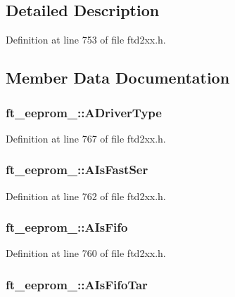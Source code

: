 \subsection{Detailed Description}


Definition at line 753 of file ftd2xx.h.

\subsection{Member Data Documentation}
\hypertarget{structft__eeprom__2232_ad86a60a990160e5976e563365b7d05d0}{
\subsubsection[{ADriverType}]{ {\bf ft\_\-eeprom\_::ADriverType}}}
\label{structft__eeprom__2232_ad86a60a990160e5976e563365b7d05d0}


Definition at line 767 of file ftd2xx.h.\hypertarget{structft__eeprom__2232_acbcbf6335afad8a22eac6a575f385785}{
\subsubsection[{AIsFastSer}]{ {\bf ft\_\-eeprom\_::AIsFastSer}}}
\label{structft__eeprom__2232_acbcbf6335afad8a22eac6a575f385785}


Definition at line 762 of file ftd2xx.h.\hypertarget{structft__eeprom__2232_acf4ea789894df80107249291ac055a6f}{
\subsubsection[{AIsFifo}]{ {\bf ft\_\-eeprom\_::AIsFifo}}}
\label{structft__eeprom__2232_acf4ea789894df80107249291ac055a6f}


Definition at line 760 of file ftd2xx.h.\hypertarget{structft__eeprom__2232_a6b3aab2f52076295cc32a5a785194b78}{
\subsubsection[{AIsFifoTar}]{ {\bf ft\_\-eeprom\_::AIsFifoTar}}}
\label{structft__eeprom__2232_a6b3aab2f52076295cc32a5a785194b78}


